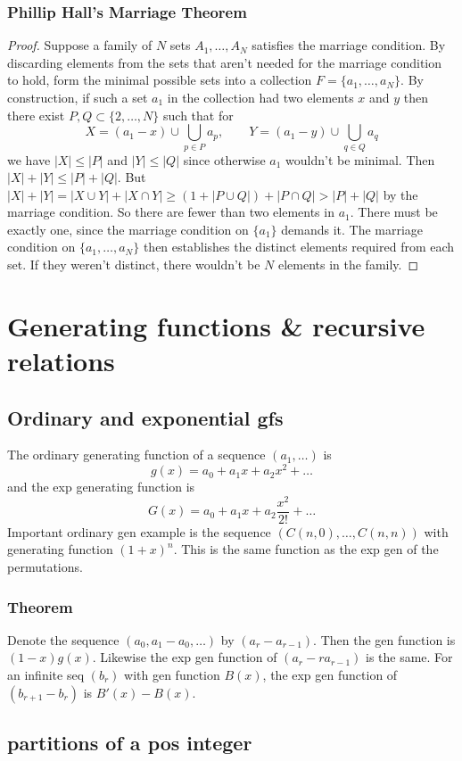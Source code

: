 \subsubsection{Phillip Hall's Marriage Theorem}
\begin{proof}
Suppose a family of $N$ sets $A_1, \hdots, A_N$ satisfies the marriage condition.
By discarding elements from the sets
that aren't needed for the marriage condition to hold,
form the minimal possible sets into a collection $F = \{ a_1, \hdots, a_N \}$.
By construction, if such a set $a_1$ in the collection
had two elements $x$ and $y$ then there exist $P,Q \subset \{2,\hdots, N\}$ such that for
$$
X = (a_1 - x) \cup \bigcup_{p \in P} a_p, \quad \quad Y = (a_1 - y) \cup \bigcup_{q \in Q} a_q
$$
we have $|X| \leq |P|$ and $|Y| \leq |Q|$ since otherwise $a_1$ wouldn't be minimal.
Then $|X|+|Y| \leq |P|+|Q|$.
But $|X|+|Y| = |X \cup Y| + |X \cap Y| \geq (1 + |P \cup Q|) + |P \cap Q| > |P| + |Q|$
by the marriage condition. So there are fewer than two elements in $a_1$.
There must be exactly one, since the marriage condition on $\{a_1\}$ demands it.
The marriage condition on $\{a_1,\hdots,a_N\}$ then establishes the distinct
elements required from each set. If they weren't distinct, there wouldn't be $N$
elements in the family.
\end{proof}
\section{Generating functions \& recursive relations}
\subsection{Ordinary and exponential gfs}
The ordinary generating function of a sequence $(a_1,\hdots)$ is $$
g(x) = a_0 + a_1 x + a_2 x^2 + \hdots
$$
and the exp generating function is $$
G(x) = a_0 + a_1 x + a_2\frac{x^2}{2!} + \hdots
$$
Important ordinary gen example is the sequence $(C(n,0),\hdots,C(n,n))$ with generating function $(1+x)^n$. This is the same function as the exp gen of the permutations.
\subsubsection{Theorem}
Denote the sequence $(a_0,a_1-a_0,\hdots)$ by $(a_r - a_{r-1})$.
Then the gen function is $(1-x)g(x)$. Likewise the exp gen function
of $(a_r-ra_{r-1})$ is the same. For an infinite seq $(b_r)$ with gen function $B(x)$,
the exp gen function of $(b_{r+1}-b_r)$ is $B'(x) - B(x)$.
\subsection{partitions of a pos integer}
